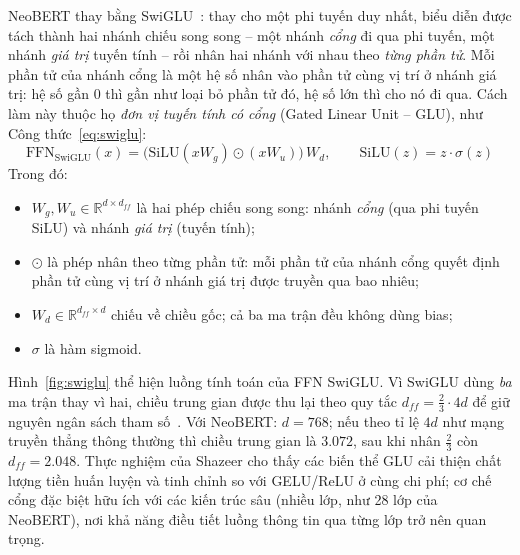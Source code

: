 NeoBERT thay bằng SwiGLU~\cite{shazeer2020glu}: thay cho một phi tuyến duy nhất, biểu diễn
được tách thành hai nhánh chiếu song song -- một nhánh \textit{cổng} đi qua phi tuyến, một
nhánh \textit{giá trị} tuyến tính -- rồi nhân hai nhánh với nhau theo \textit{từng phần tử}.
Mỗi phần tử của nhánh cổng là một hệ số nhân vào phần tử cùng vị trí ở nhánh giá trị: hệ số
gần $0$ thì gần như loại bỏ phần tử đó, hệ số lớn thì cho nó đi qua. Cách làm này thuộc họ \textit{đơn
vị tuyến tính có cổng} (Gated Linear Unit -- GLU), như Công thức~\eqref{eq:swiglu}:
\begin{equation}
  \label{eq:swiglu}
  \mathrm{FFN}_{\mathrm{SwiGLU}}(x) = \big(\mathrm{SiLU}(x W_g) \odot (x W_u)\big)\, W_d,
  \qquad \mathrm{SiLU}(z) = z \cdot \sigma(z)
\end{equation}
Trong đó:
\begin{itemize}
  \item $W_g, W_u \in \mathbb{R}^{d \times d_{ff}}$ là hai phép chiếu song song: nhánh
        \textit{cổng} (qua phi tuyến SiLU) và nhánh \textit{giá trị} (tuyến tính);
  \item $\odot$ là phép nhân theo từng phần tử: mỗi phần tử của nhánh cổng quyết định phần
        tử cùng vị trí ở nhánh giá trị được truyền qua bao nhiêu;
  \item $W_d \in \mathbb{R}^{d_{ff} \times d}$ chiếu về chiều gốc; cả ba ma trận đều
        không dùng bias;
  \item $\sigma$ là hàm sigmoid.
\end{itemize}
Hình~\ref{fig:swiglu} thể hiện luồng tính toán của FFN SwiGLU.
Vì SwiGLU dùng \textit{ba} ma trận thay vì hai, chiều trung gian được thu lại theo quy
tắc $d_{ff} = \tfrac{2}{3} \cdot 4d$ để giữ nguyên ngân sách tham số~\cite{shazeer2020glu}.
Với NeoBERT: $d = 768$; nếu theo tỉ lệ $4d$ như mạng truyền thẳng thông thường thì chiều
trung gian là $3.072$, sau khi nhân $\tfrac{2}{3}$ còn $d_{ff} = 2.048$. Thực nghiệm của Shazeer cho thấy các biến thể GLU
cải thiện chất lượng tiền huấn luyện và tinh chỉnh so với GELU/ReLU ở cùng chi phí; cơ
chế cổng đặc biệt hữu ích với các kiến trúc sâu (nhiều lớp, như 28 lớp của NeoBERT), nơi
khả năng điều tiết luồng thông tin qua từng lớp trở nên quan trọng.

